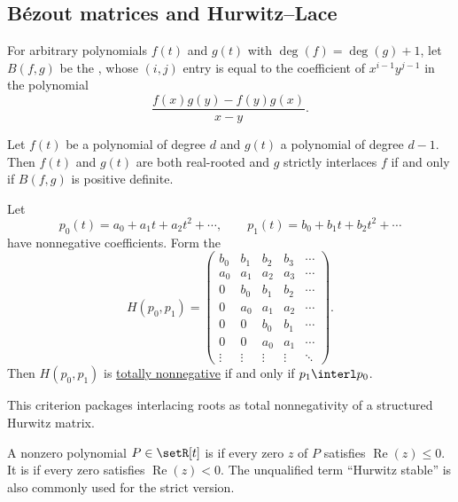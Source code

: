 \subsection[bezoutMatrix]{Bézout matrices and Hurwitz--Lace}

For arbitrary polynomials $f(t)$ and $g(t)$ with $\deg(f) = \deg(g)+1$,
let $B(f,g)$ be the \label{bezoutMatrixDefinition},
whose $(i,j)$ entry is equal to the coefficient of $x^{i-1} y^{j-1}$ in the polynomial
\[
 \frac{f(x)g(y) - f(y)g(x)}{x-y}.
\]

\begin{theorem}
Let $f(t)$ be a polynomial of degree $d$ and $g(t)$ a polynomial of degree $d-1$.
Then $f(t)$ and $g(t)$ are both real-rooted and $g$ strictly interlaces $f$
if and only if $B(f,g)$ is positive definite.
\end{theorem}



\begin{theorem}
\label{hurwitzLaceCriterion}
Let
\[
p_0(t)=a_0+a_1t+a_2t^2+\dotsb,\qquad
p_1(t)=b_0+b_1t+b_2t^2+\dotsb
\]
have nonnegative coefficients.  Form the
\label{hurwitzMatrix}
\[
H(p_0,p_1)=
\begin{pmatrix}
b_0 & b_1 & b_2 & b_3 & \dotsb \\
a_0 & a_1 & a_2 & a_3 & \dotsb \\
0   & b_0 & b_1 & b_2 & \dotsb \\
0   & a_0 & a_1 & a_2 & \dotsb \\
0   & 0   & b_0 & b_1 & \dotsb \\
0   & 0   & a_0 & a_1 & \dotsb \\
\vdots & \vdots & \vdots & \vdots & \ddots
\end{pmatrix}.
\]
Then $H(p_0,p_1)$ is \hyperref[totallyNonnegative]{totally nonnegative}
if and only if $p_1 \interl p_0$.
\end{theorem}

This criterion packages interlacing roots as total nonnegativity of a
structured Hurwitz matrix.

\begin{definition}
A nonzero polynomial $P\in\setR[t]$ is
\label{weakHurwitzStablePolynomial}
if every zero $z$ of $P$ satisfies $\operatorname{Re}(z)\leq 0$.
It is \label{strictHurwitzStablePolynomial}
if every zero satisfies $\operatorname{Re}(z)<0$.
The unqualified term ``Hurwitz stable'' is also commonly used for the strict
version.
\end{definition}

